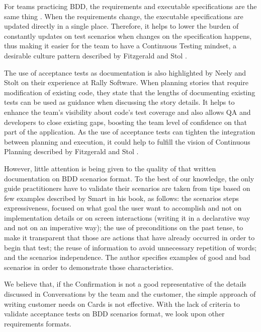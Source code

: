 For teams practicing BDD, the requirements and executable specifications are the same thing \cite{Smart_2014}. When the requirements change, the executable specifications are updated directly in a single place. Therefore, it helps to lower the burden of constantly updates on test scenarios when changes on the specification happens, thus making it easier for the team to have a Continuous Testing mindset, a desirable culture pattern described by Fitzgerald and Stol \cite{Fitzgerald_Stol_2014}.
 
The use of acceptance tests as documentation is also highlighted by Neely and Stolt \cite{Neely_Stolt_2013} on their experience at Rally Software. When planning stories that require modification of existing code, they state that the lengths of documenting existing tests can be used as guidance when discussing the story details. It helps to enhance the team's visibility about code's test coverage and also allows QA and developers to close existing gaps, boosting the team level of confidence on that part of the application. As the use of acceptance tests can tighten the integration between planning and execution, it could help to fulfill the vision of Continuous Planning described by Fitzgerald and Stol \cite{Fitzgerald_Stol_2014}.

However, little attention is being given to the quality of that written documentation on BDD scenarios format. To the best of our knowledge, the only guide practitioners have to validate their scenarios are taken from tips based on few examples described by Smart \cite{Smart_2014} in his book, as follows: the scenarios steps expressiveness, focused on what goal the user want to accomplish and not on implementation details or on screen interactions (writing it in a declarative way and not on an imperative way); the use of preconditions on the past tense, to make it transparent that those are actions that have already occurred in order to begin that test; the reuse of information to avoid unnecessary repetition of words; and the scenarios independence. The author specifies examples of good and bad scenarios in order to demonstrate those characteristics.  

We believe that, if the Confirmation is not a good representative of the details discussed in Conversations by the team and the customer, the simple approach of writing customer needs on Cards is not effective. With the lack of criteria to validate acceptance tests on BDD scenarios format, we look upon other requirements formats.

